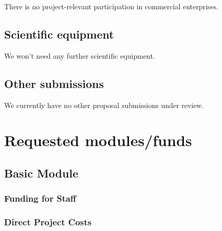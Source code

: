 \documentclass{scrartcl}
\begin{document}
There is no project-relevant participation in commercial enterprises.  

\subsection{Scientific equipment}

We won't need any further scientific equipment. 

\subsection{Other submissions}

We currently have no other proposal submissions under review.  

\section{Requested modules/funds}

\subsection{Basic Module}

\subsubsection{Funding for Staff}
\label{sec:staff}



\subsubsection{Direct Project Costs}
\end{document}
